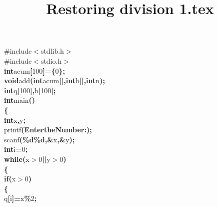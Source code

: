 \documentclass[a4paper, 11pt]{article}
\title{Restoring division 1.tex}
\newcommand\SPC{\hspace*{0.6em}}
\newcommand\QOT{\mbox{\char 34}}
\newcommand{\CppAIdentifier}[1]{#1}
\newcommand{\CppANumber}[1]{\textcolor[rgb]{0.5,0,0.5}{#1}}
\newcommand{\CppAPreprocessor}[1]{\textcolor[rgb]{0,0.5,0}{#1}}
\newcommand{\CppAReservedWord}[1]{\textbf{#1}}
\newcommand{\CppASpace}[1]{\colorbox[rgb]{1,1,1}{#1}}
\newcommand{\CppAString}[1]{\textbf{\textcolor[rgb]{0,0,1}{#1}}}
\newcommand{\CppASymbol}[1]{\textbf{\textcolor[rgb]{1,0,0}{#1}}}
\begin{document}
\begin{ttfamily}
\noindent
\CppAPreprocessor{\#include$<$stdlib.h$>$}\\
\CppAPreprocessor{\#include$<$stdio.h$>$}\\
\CppAReservedWord{int}\CppASpace{\SPC }\CppAIdentifier{acum}\CppASymbol{[}\CppANumber{100}\CppASymbol{]}\CppASymbol{=}\CppASymbol{\{}\CppANumber{0}\CppASymbol{\}}\CppASpace{\SPC }\CppASymbol{;}\\
\CppAReservedWord{void}\CppASpace{\SPC }\CppAIdentifier{add}\CppASymbol{(}\CppAReservedWord{int}\CppASpace{\SPC }\CppAIdentifier{acum}\CppASymbol{[}\CppASymbol{]}\CppASymbol{,}\CppAReservedWord{int}\CppASpace{\SPC }\CppAIdentifier{b}\CppASymbol{[}\CppASymbol{]}\CppASymbol{,}\CppAReservedWord{int}\CppASpace{\SPC }\CppAIdentifier{n}\CppASymbol{)}\CppASymbol{;}\\
\CppAReservedWord{int}\CppASpace{\SPC }\CppAIdentifier{q}\CppASymbol{[}\CppANumber{100}\CppASymbol{]}\CppASymbol{,}\CppAIdentifier{b}\CppASymbol{[}\CppANumber{100}\CppASymbol{]}\CppASymbol{;}\\
\CppAReservedWord{int}\CppASpace{\SPC }\CppAIdentifier{main}\CppASymbol{(}\CppASymbol{)}\\
\CppASymbol{\{}\\
\CppAReservedWord{int}\CppASpace{\SPC }\CppAIdentifier{x}\CppASymbol{,}\CppAIdentifier{y}\CppASymbol{;}\\
\CppAIdentifier{printf}\CppASymbol{(}\CppAString{\QOT Enter\SPC the\SPC Number\SPC :\QOT }\CppASymbol{)}\CppASymbol{;}\\
\CppAIdentifier{scanf}\CppASymbol{(}\CppAString{\QOT \%d\%d\QOT }\CppASymbol{,}\CppASymbol{\&}\CppAIdentifier{x}\CppASymbol{,}\CppASymbol{\&}\CppAIdentifier{y}\CppASymbol{)}\CppASymbol{;}\\
\CppAReservedWord{int}\CppASpace{\SPC }\CppAIdentifier{i}\CppASymbol{=}\CppANumber{0}\CppASymbol{;}\\
\CppAReservedWord{while}\CppASymbol{(}\CppAIdentifier{x}\CppASymbol{$>$}\CppANumber{0}\CppASymbol{||}\CppAIdentifier{y}\CppASymbol{$>$}\CppANumber{0}\CppASymbol{)}\\
\CppASymbol{\{}\\
\CppAReservedWord{if}\CppASymbol{(}\CppAIdentifier{x}\CppASymbol{$>$}\CppANumber{0}\CppASymbol{)}\\
\CppASymbol{\{}\\
\CppAIdentifier{q}\CppASymbol{[}\CppAIdentifier{i}\CppASymbol{]}\CppASymbol{=}\CppAIdentifier{x}\CppASymbol{\%}\CppANumber{2}\CppASymbol{;}\\

\end{ttfamily}
\end{document}
